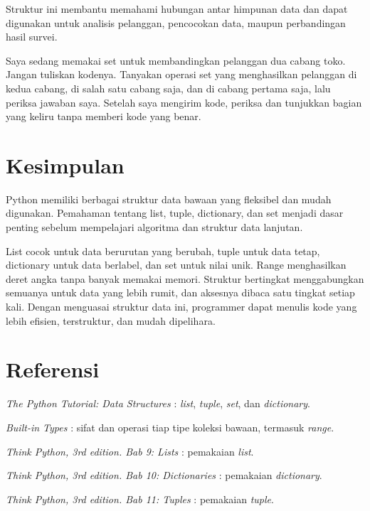 \begin{enumerate}
Struktur ini membantu memahami hubungan antar himpunan data dan dapat digunakan untuk 
analisis pelanggan, pencocokan data, maupun perbandingan hasil survei.

  \begin{promptterarah}
  Saya sedang memakai set untuk membandingkan pelanggan dua cabang toko. Jangan tuliskan kodenya. Tanyakan operasi set yang menghasilkan pelanggan di kedua cabang, di salah satu cabang saja, dan di cabang pertama saja, lalu periksa jawaban saya. Setelah saya mengirim kode, periksa dan tunjukkan bagian yang keliru tanpa memberi kode yang benar.
  \end{promptterarah}
\end{enumerate}

\section{Kesimpulan}
Python memiliki berbagai struktur data bawaan yang fleksibel dan mudah digunakan.
Pemahaman tentang list, tuple, dictionary, dan set menjadi dasar penting sebelum mempelajari algoritma dan struktur data lanjutan.

List cocok untuk data berurutan yang berubah, tuple untuk data tetap, dictionary untuk data berlabel, dan set untuk nilai unik. Range menghasilkan deret angka tanpa banyak memakai memori. Struktur bertingkat menggabungkan semuanya untuk data yang lebih rumit, dan aksesnya dibaca satu tingkat setiap kali.
Dengan menguasai struktur data ini, programmer dapat menulis kode yang lebih efisien, terstruktur, dan mudah dipelihara.

\section*{Referensi}
\begin{daftarrapat}
  \item \textit{The Python Tutorial: Data Structures} \cite{py-tut-ds}: \textit{list}, \textit{tuple}, \textit{set}, dan \textit{dictionary}.
  \item \textit{Built-in Types} \cite{py-stdtypes}: sifat dan operasi tiap tipe koleksi bawaan, termasuk \textit{range}.
  \item \textit{Think Python, 3rd edition. Bab 9: Lists} \cite{thinkpython-ch9}: pemakaian \textit{list}.
  \item \textit{Think Python, 3rd edition. Bab 10: Dictionaries} \cite{thinkpython-ch10}: pemakaian \textit{dictionary}.
  \item \textit{Think Python, 3rd edition. Bab 11: Tuples} \cite{thinkpython-ch11}: pemakaian \textit{tuple}.
\end{daftarrapat}
